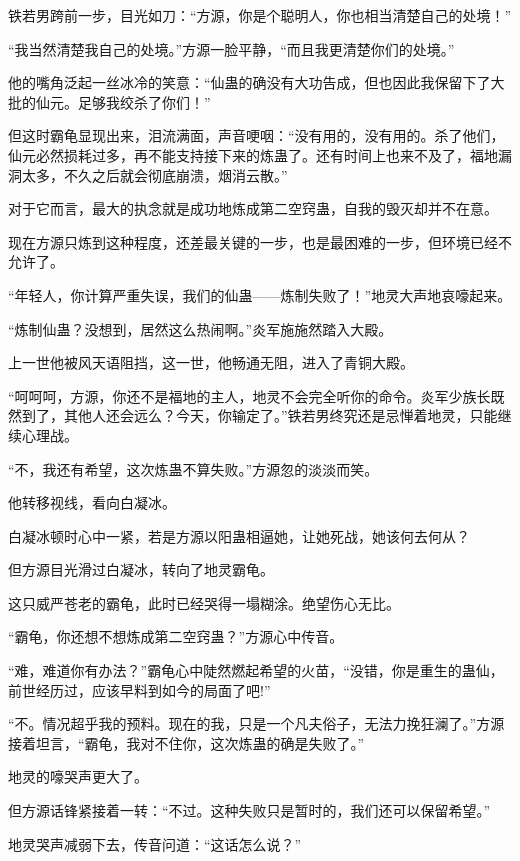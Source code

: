 
\begin{this_body}

铁若男跨前一步，目光如刀：“方源，你是个聪明人，你也相当清楚自己的处境！”

“我当然清楚我自己的处境。”方源一脸平静，“而且我更清楚你们的处境。”

他的嘴角泛起一丝冰冷的笑意：“仙蛊的确没有大功告成，但也因此我保留下了大批的仙元。足够我绞杀了你们！”

但这时霸龟显现出来，泪流满面，声音哽咽：“没有用的，没有用的。杀了他们，仙元必然损耗过多，再不能支持接下来的炼蛊了。还有时间上也来不及了，福地漏洞太多，不久之后就会彻底崩溃，烟消云散。”

对于它而言，最大的执念就是成功地炼成第二空窍蛊，自我的毁灭却并不在意。

现在方源只炼到这种程度，还差最关键的一步，也是最困难的一步，但环境已经不允许了。

“年轻人，你计算严重失误，我们的仙蛊——炼制失败了！”地灵大声地哀嚎起来。

“炼制仙蛊？没想到，居然这么热闹啊。”炎军施施然踏入大殿。

上一世他被风天语阻挡，这一世，他畅通无阻，进入了青铜大殿。

“呵呵呵，方源，你还不是福地的主人，地灵不会完全听你的命令。炎军少族长既然到了，其他人还会远么？今天，你输定了。”铁若男终究还是忌惮着地灵，只能继续心理战。

“不，我还有希望，这次炼蛊不算失败。”方源忽的淡淡而笑。

他转移视线，看向白凝冰。

白凝冰顿时心中一紧，若是方源以阳蛊相逼她，让她死战，她该何去何从？

但方源目光滑过白凝冰，转向了地灵霸龟。

这只威严苍老的霸龟，此时已经哭得一塌糊涂。绝望伤心无比。

“霸龟，你还想不想炼成第二空窍蛊？”方源心中传音。

“难，难道你有办法？”霸龟心中陡然燃起希望的火苗，“没错，你是重生的蛊仙，前世经历过，应该早料到如今的局面了吧!”

“不。情况超乎我的预料。现在的我，只是一个凡夫俗子，无法力挽狂澜了。”方源接着坦言，“霸龟，我对不住你，这次炼蛊的确是失败了。”

地灵的嚎哭声更大了。

但方源话锋紧接着一转：“不过。这种失败只是暂时的，我们还可以保留希望。”

地灵哭声减弱下去，传音问道：“这话怎么说？”


\end{this_body}
